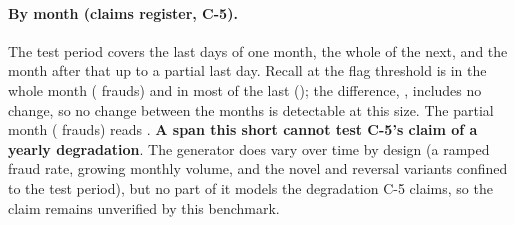 \begin{table}[htbp]
\centering
\small
\caption{The full-volume model at assumed alert budgets (\nPbDays{} whole test days; precision
intervals resampled by day). Cap: the precision of a perfect ranking at that budget. Share: the model's precision as a fraction of
the cap.
RWF: Rwandan francs over the period. Single feature: \texttt{velocity\_ratio\_1h\_vs\_30d} at the
same budget. Source \texttt{docs/benchmarks/pb66\_d8083dbc.txt}.}
\label{tab:budgets}
\end{table}

\paragraph{By month (claims register, C-5).} The test period covers the last days of one month, the
whole of the next, and the month after that up to a partial last day. Recall at the flag threshold is
\nMonNovRecall{} \nMonNovRecallci{} in the whole month (\nMonNovFrauds{} frauds) and \nMonDecRecall{}
\nMonDecRecallci{} in most of the last (\nMonDecFrauds{});
the difference, \nMonDiff{} \nMonDiffci{}, includes no change, so no change between the months is
detectable at this size. The partial month (\nMonOctFrauds{} frauds) reads \nMonOctRecall{}
\nMonOctRecallci{}. \textbf{A span this short cannot test C-5's claim of a yearly degradation}. The generator does
vary over time by design (a ramped fraud rate, growing monthly volume, and the novel and reversal
variants confined to the test period), but no part of it models the degradation C-5 claims, so the
claim remains unverified by this benchmark.

